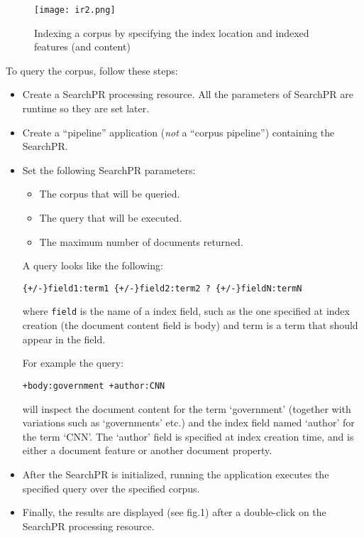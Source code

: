 %
\begin{figure}[htbp]
\begin{center}
\texttt{[image: ir2.png]}
\end{center}
\caption{Indexing a corpus by specifying the index location and
indexed features (and content)}
\label{fig:ir2}
\end{figure}
%



To query the corpus, follow these steps:

\begin{itemize}
%
\item
Create a SearchPR processing resource. All the parameters of SearchPR
are runtime so they are set later.
%
\item
Create a ``pipeline'' application ({\em not} a ``corpus pipeline'') containing
the SearchPR.
%
\item
Set the following SearchPR parameters:
 \begin{itemize}
 \item
 The corpus that will be queried.
 \item
 The query that will be executed.
 \item
 The maximum number of documents returned.
 \end{itemize}

A query looks like the following:

\begin{verbatim}
{+/-}field1:term1 {+/-}field2:term2 ? {+/-}fieldN:termN
\end{verbatim}
where \texttt{field} is the name of a index field, such as the one specified at
index creation (the document content field is body) and term is a term
that should appear in the field.

For example the query:
\begin{verbatim}
+body:government +author:CNN
\end{verbatim}
will inspect the document content for the term `government' (together
with variations such as `governments' etc.) and the index field named
`author' for the term `CNN'. The `author' field is specified at index
creation time, and is either a document feature or another document
property.

%
\item
After the SearchPR is initialized, running the application executes
the specified query over the specified corpus.

%
\item
Finally, the results are displayed (see fig.1) after a double-click on
the SearchPR processing resource.
%
\end{itemize}

